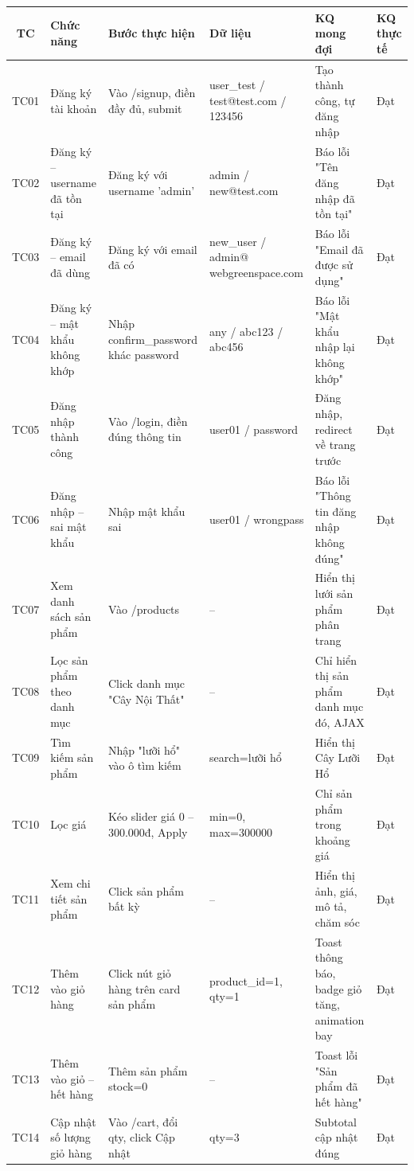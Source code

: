 \documentclass[a4paper]{article}
\begin{document}
\begin{longtable}{|c|p{2.6cm}|p{3.3cm}|p{2.3cm}|p{3cm}|p{1.6cm}|}
\hline
\textbf{TC} & \textbf{Chức năng} & \textbf{Bước thực hiện} & \textbf{Dữ liệu} & \textbf{KQ mong đợi} & \textbf{KQ thực tế} \\
\hline
\endhead
TC01 & Đăng ký tài khoản & Vào /signup, điền đầy đủ, submit & user\_test / test@test.com / 123456 & Tạo thành công, tự đăng nhập & Đạt \\
\hline
TC02 & Đăng ký -- username đã tồn tại & Đăng ký với username 'admin' & admin / new@test.com & Báo lỗi "Tên đăng nhập đã tồn tại" & Đạt \\
\hline
TC03 & Đăng ký -- email đã dùng & Đăng ký với email đã có & new\_user / admin@ webgreenspace.com & Báo lỗi "Email đã được sử dụng" & Đạt \\
\hline
TC04 & Đăng ký -- mật khẩu không khớp & Nhập confirm\_password khác password & any / abc123 / abc456 & Báo lỗi "Mật khẩu nhập lại không khớp" & Đạt \\
\hline
TC05 & Đăng nhập thành công & Vào /login, điền đúng thông tin & user01 / password & Đăng nhập, redirect về trang trước & Đạt \\
\hline
TC06 & Đăng nhập -- sai mật khẩu & Nhập mật khẩu sai & user01 / wrongpass & Báo lỗi "Thông tin đăng nhập không đúng" & Đạt \\
\hline
TC07 & Xem danh sách sản phẩm & Vào /products & -- & Hiển thị lưới sản phẩm phân trang & Đạt \\
\hline
TC08 & Lọc sản phẩm theo danh mục & Click danh mục "Cây Nội Thất" & -- & Chỉ hiển thị sản phẩm danh mục đó, AJAX & Đạt \\
\hline
TC09 & Tìm kiếm sản phẩm & Nhập "lưỡi hổ" vào ô tìm kiếm & search=lưỡi hổ & Hiển thị Cây Lưỡi Hổ & Đạt \\
\hline
TC10 & Lọc giá & Kéo slider giá 0 -- 300.000đ, Apply & min=0, max=300000 & Chỉ sản phẩm trong khoảng giá & Đạt \\
\hline
TC11 & Xem chi tiết sản phẩm & Click sản phẩm bất kỳ & -- & Hiển thị ảnh, giá, mô tả, chăm sóc & Đạt \\
\hline
TC12 & Thêm vào giỏ hàng & Click nút giỏ hàng trên card sản phẩm & product\_id=1, qty=1 & Toast thông báo, badge giỏ tăng, animation bay & Đạt \\
\hline
TC13 & Thêm vào giỏ -- hết hàng & Thêm sản phẩm stock=0 & -- & Toast lỗi "Sản phẩm đã hết hàng" & Đạt \\
\hline
TC14 & Cập nhật số lượng giỏ hàng & Vào /cart, đổi qty, click Cập nhật & qty=3 & Subtotal cập nhật đúng & Đạt \\

\end{longtable}
\end{document}
